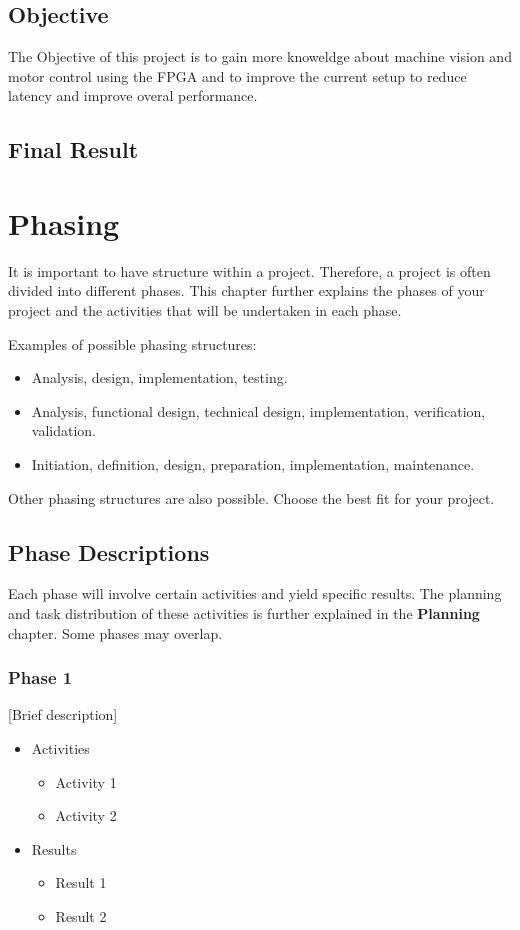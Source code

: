 \documentclass{article}
\begin{document}
\subsection{Objective}
The Objective of this project is to gain more knoweldge about machine vision and motor control using the FPGA 
and to improve the current setup to reduce latency and improve overal performance.
\subsection{Final Result}


\newpage
\section{Phasing}
It is important to have structure within a project. Therefore, a project is often divided into different phases. This chapter further explains the phases of your project and the activities that will be undertaken in each phase.

Examples of possible phasing structures:
\begin{itemize}
    \item Analysis, design, implementation, testing.
    \item Analysis, functional design, technical design, implementation, verification, validation.
    \item Initiation, definition, design, preparation, implementation, maintenance.
\end{itemize}
Other phasing structures are also possible. Choose the best fit for your project.

\subsection{Phase Descriptions}
Each phase will involve certain activities and yield specific results. The planning and task distribution of these activities is further explained in the \textbf{Planning} chapter. Some phases may overlap.

\subsubsection{Phase 1}
[Brief description]
\begin{itemize}
    \item Activities
    \begin{itemize}
        \item Activity 1
        \item Activity 2
    \end{itemize}
    \item Results
    \begin{itemize}
        \item Result 1
        \item Result 2
    \end{itemize}
\end{itemize}
\end{document}
